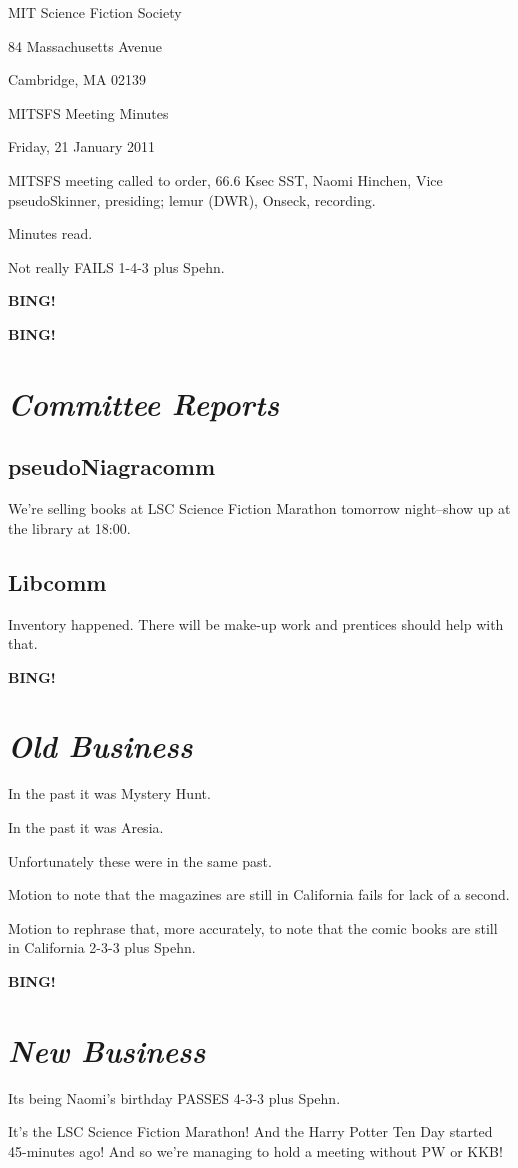 \documentclass[10pt]{article}
\newcommand{\bing}{{\bf BING!} }
\newcommand{\goto}[1]{\bing \vskip 12pt \section*{{\em{#1}}}}
\newcommand{\ps}{ plus Spehn\xspace}
\newcommand{\skinner}{Naomi Hinchen, Vice pseudoSkinner}
\newcommand{\onseck}{lemur (DWR), Onseck}
\newcommand{\meetingdate}{Friday, 21 January 2011}
\begin{document}
\begin{center}

MIT Science Fiction Society

84 Massachusetts Avenue

Cambridge, MA 02139

\vspace{12pt}

MITSFS Meeting Minutes

\meetingdate

\end{center}

\vspace{18pt}

\setlength{\parskip}{6pt}

\noindent
MITSFS meeting called to order, 66.6 Ksec SST,
\skinner, presiding; \onseck, recording.

Minutes read.

Not really FAILS 1-4-3\ps.

\bing

\goto{Committee Reports}

\subsection*{pseudoNiagracomm}

We're selling books at LSC Science Fiction Marathon tomorrow night--show
up at the library at 18:00.

\subsection*{Libcomm}

Inventory happened.  There will be make-up work and prentices should
help with that.

\goto{Old Business}

In the past it was Mystery Hunt.

In the past it was Aresia.

Unfortunately these were in the same past.

Motion to note that the magazines are still in California fails
for lack of a second.

Motion to rephrase that, more accurately, to note that the comic
books are still in California 2-3-3\ps.

\goto{New Business}

Its being Naomi's birthday PASSES 4-3-3\ps.

It's the LSC Science Fiction Marathon!  And the Harry Potter
Ten Day started 45-minutes ago!  And so we're managing to hold
a meeting without PW or KKB!
\end{document}
